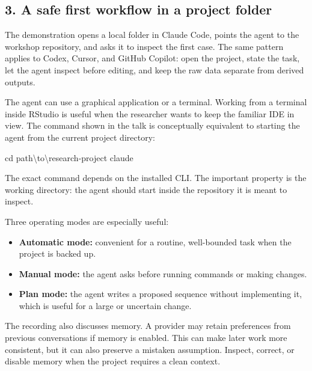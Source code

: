 \documentclass[
  english,
  10pt,
]{article}
\newenvironment{Shaded}{\begin{snugshade}}{\end{snugshade}}
\newcommand{\FunctionTok}[1]{\textcolor[rgb]{0.28,0.35,0.67}{#1}}
\newcommand{\NormalTok}[1]{\textcolor[rgb]{0.00,0.23,0.31}{#1}}
\providecommand{\tightlist}{%
  \setlength{\itemsep}{0pt}\setlength{\parskip}{0pt}}
\begin{document}
\subsection{3. A safe first workflow in a project
folder}\label{a-safe-first-workflow-in-a-project-folder}

The demonstration opens a local folder in Claude Code, points the agent
to the workshop repository, and asks it to inspect the first case. The
same pattern applies to Codex, Cursor, and GitHub Copilot: open the
project, state the task, let the agent inspect before editing, and keep
the raw data separate from derived outputs.

The agent can use a graphical application or a terminal. Working from a
terminal inside RStudio is useful when the researcher wants to keep the
familiar IDE in view. The command shown in the talk is conceptually
equivalent to starting the agent from the current project directory:

\begin{Shaded}
\begin{Highlighting}[]
\FunctionTok{cd}\NormalTok{ path\textbackslash{}to\textbackslash{}research{-}project}
\NormalTok{claude}
\end{Highlighting}
\end{Shaded}

The exact command depends on the installed CLI. The important property
is the working directory: the agent should start inside the repository
it is meant to inspect.

Three operating modes are especially useful:

\begin{itemize}
\tightlist
\item
  \textbf{Automatic mode:} convenient for a routine, well-bounded task
  when the project is backed up.
\item
  \textbf{Manual mode:} the agent asks before running commands or making
  changes.
\item
  \textbf{Plan mode:} the agent writes a proposed sequence without
  implementing it, which is useful for a large or uncertain change.
\end{itemize}

The recording also discusses memory. A provider may retain preferences
from previous conversations if memory is enabled. This can make later
work more consistent, but it can also preserve a mistaken assumption.
Inspect, correct, or disable memory when the project requires a clean
context.
\end{document}
